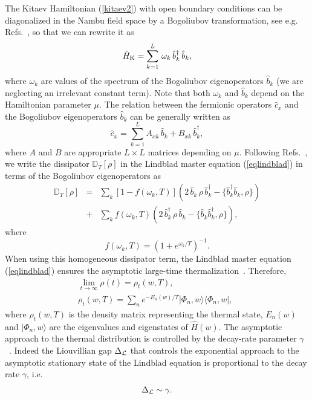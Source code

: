 The Kitaev Hamiltonian (\ref{kitaev2}) with open boundary conditions
can be diagonalized in the Nambu field space by a Bogoliubov
transformation, see e.g. Refs.~\cite{PF70,bla86,dr2021self}, so that
we can rewrite it as
\begin{equation}
\hat{H}_{\rm K}=\sum_{k=1}^L\,\omega_k \,\hat b^\dagger_k\, \hat b_k,
  \label{Hdiag}
\end{equation}
where $\omega_k$ are values of the spectrum of the Bogoliubov
eigenoperators $\hat b_k$ (we are neglecting an irrelevant constant
term). Note that both $\omega_k$ and $\hat b_k$ depend on the
Hamiltonian parameter $\mu$.  The relation between the fermionic
operators $\hat{c}_x$ and the Bogoliubov eigenoperators $\hat{b}_k$
can be generally written as~\cite{PF70,bla86,dr2021self}
\begin{equation}
  \label{transBogol}
  \hat c_x = \sum_{k=1}^L A_{xk} \,\hat{b}_k + B_{xk}
  \,\hat{b}_k^\dagger,
\end{equation}
where $A$ and $B$ are appropriate $L\times L$ matrices depending on
$\mu$.  Following Refs.~\cite{dr2021self,CPR-2022-otto_engine}, we write the dissipator
$\mathbb{D}_T[\rho]$ in the Lindblad master equation (\ref{eqlindblad})
in terms of the Bogoliubov eigenoperators as
\begin{eqnarray}
  \mathbb{D}_T[\rho] &=&
\sum_k [1-f(\omega_k,T)]
\left( 2 \,\hat{b}_k\,\rho\,\hat{b}_k^\dagger - 
\{\hat{b}_k^\dagger\hat{b}_k,\rho\}\right)  \nonumber\\
&+&
\sum_k f(\omega_k,T)
\left( 2 \,\hat{b}_k^\dagger\,\rho\,\hat{b}_k - 
\{\hat{b}_k\hat{b}_k^\dagger,\rho\}\right), \label{Dtrho}
\end{eqnarray}
where
\begin{equation}
  f(\omega_k,T) = \left( 1 + e^{\omega_k/T}\right)^{-1}.
  \label{fomt}
\end{equation}
When using this homogeneous dissipator term, the Lindblad master
equation (\ref{eqlindblad}) ensures the asymptotic large-time
thermalization~\cite{dr2021self}. Therefore,
\begin{eqnarray}
  &&\lim_{t\to\infty} \rho(t)  = \rho_t(w,T), \label{asyrho}\\
&&\rho_t(w,T) = \sum_n e^{-E_n(w)/T}|\Phi_n, w\rangle \langle \Phi_n, w|,
 \qquad \label{termrho}
\end{eqnarray}
where $\rho_t(w,T)$ is the density matrix representing the thermal
state, $E_n(w)$ and $|\Phi_n, w\rangle$ are the eigenvalues and
eigenstates of $\hat{H}(w)$.  The asymptotic approach to the thermal
distribution is controlled by the decay-rate parameter
$\gamma$~\cite{dr2021self}. Indeed the Liouvillian gap $\Delta_{\cal L}$
that controls the exponential approach to the asymptotic stationary
state of the Lindblad equation is proportional to the decay rate
$\gamma$, i.e.
\begin{equation}
  \Delta_{\cal L}\sim \gamma.
  \label{deltal}
  \end{equation}

